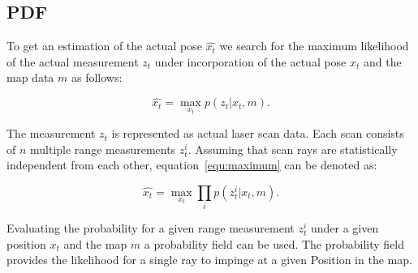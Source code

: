\documentclass[conference]{IEEEtran}
\begin{document}
%
%

\subsection{PDF}
To get an estimation of the actual pose $\widehat{x_t}$  we search for the maximum likelihood of the actual measurement $z_t$ under incorporation of the actual pose $x_t$ and the map data $m$ as follows:

\begin{equation}
	\label{equ:maximum}
	\widehat{x_t} = \max_{x_t} p \left (  z_t|x_t,m \right ).
\end{equation}

The measurement $z_t$ is represented as actual laser scan data. Each scan consists of $n$ multiple range measurements $z^i_t$. Assuming that scan rays are statistically independent from each other, equation~\ref{equ:maximum} can be denoted as:

\begin{equation}
	\label{equ:multiply}
	\widehat{x_t} = \max_{x_t} \prod_i p \left ( z^i_t|x_t,m \right ).
\end{equation}

Evaluating the probability for a given range measurement $z^i_t$ under a given position $x_t$ and the map $m$ a probability field can be used. The probability field provides the likelihood for a single ray to impinge at a given Position in the map.
\end{document}
